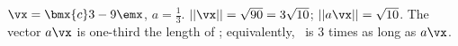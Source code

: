 {$\vx = \bmx{c} 3\\-9\emx$, $a = \frac 13$.}
{$||\vx|| = \sqrt{90} = 3\sqrt{10}$; $||a\vx|| = \sqrt{10}$. The vector $a\vx$ is one-third the length of \vx; equivalently, \vx\ is 3 times as long as $a\vx$.}
